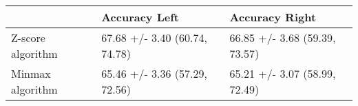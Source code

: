 \begin{tabular}{lll}
\toprule
{} &                  Accuracy Left &                 Accuracy Right \\
\midrule
Z-score algorithm &  67.68 +/- 3.40 (60.74, 74.78) &  66.85 +/- 3.68 (59.39, 73.57) \\
Minmax algorithm  &  65.46 +/- 3.36 (57.29, 72.56) &  65.21 +/- 3.07 (58.99, 72.49) \\
\bottomrule
\end{tabular}
